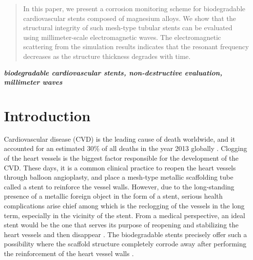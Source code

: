 \documentclass[conference,a4paper]{IEEEtran}
\begin{document}
\begin{abstract}
In this paper, we present a corrosion monitoring scheme for biodegradable cardiovascular stents composed of magnesium alloys. We show that the structural integrity of such mesh-type tubular stents can be evaluated using millimeter-scale electromagnetic waves. The electromagnetic scattering from the simulation results indicates that the resonant frequency decreases as the structure thickness degrades with time.
\end{abstract}

\textbf{\small{\emph{biodegradable cardiovascular stents, non-destructive evaluation, millimeter waves}}}


%
\IEEEpeerreviewmaketitle

\vspace{7pt}
\section{Introduction}
Cardiovascular disease (CVD) is the leading cause of death worldwide, and it accounted for an estimated 30\% of all deaths in the year 2013 globally \cite{benjamin_heart_2017}. Clogging of the heart vessels is the biggest factor responsible for the development of the CVD. These days, it is a common clinical practice to reopen the heart vessels through balloon angioplasty, and place a mesh-type metallic scaffolding tube called a stent to reinforce the vessel walls.  However, due to the long-standing presence of a metallic foreign object in the form of a stent, serious health complications arise chief among which is the reclogging of the vessels in the long term, especially in the vicinity of the stent. From a medical perspective, an ideal stent would be the one that serves its purpose of reopening and stabilizing the heart vessels and then disappear \cite{waksman_biodegradable_2006}.  The biodegradable stents  precisely offer such a possibility where the scaffold structure completely corrode away after performing the reinforcement of the heart vessel walls \cite{hou_review_2016}.
\end{document}
